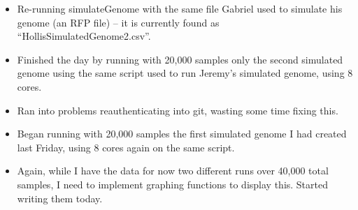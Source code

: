 \documentclass[12pt,hyperref]{labbook}
\newcommand{\sep}{\discretionary{}{}{}} %
\begin{document}
\begin{itemize}
\begin{itemize}
        \item When getCSPEstimates was originally written, Cedric had known it would be (and it is, currently) extendible to FONSE.
        However, it is not currently extendible to RFP.
        \item This led to the TODO note about copying this function and adapting it to RFP, but now it may be simpler to make it generic as Dr. Gilchrist had suggested.
        \item To do so, change it from the suffix Rcpp\sep \_\sep ROC\sep Parameter to simply Rcpp\sep \_\sep Parameter or move this function completely underneath its parent function and avoid another wrapper.
        \item Note that in R code, the current implementation reflects object orientation and inheritance.
        Thus, it's probably better to change it to simply Parameter rather than wiping out the parent wrapping.
        \item Also, the crashing for simulateGenome points to a likely segmentation fault.
        I should try to run Rstudio with simulateGenome on the gauley server, or ask Alan to run it on Windows and Visual Studio when he's back -- both runs will have better error messages to help with debugging.
    \end{itemize}
    \item Re-running simulateGenome with the same file Gabriel used to simulate his genome (an RFP file) -- it is currently found as \enquote{HollisSimulatedGenome2.csv}.
    \item Finished the day by running with 20,000 samples only the second simulated genome using the same script used to run Jeremy's simulated genome, using 8 cores.
\end{itemize}


\begin{itemize}
    \item Ran into problems reauthenticating into git, wasting some time fixing this.
    \item Began running with 20,000 samples the first simulated genome I had created last Friday, using 8 cores again on the same script.
    \item Again, while I have the data for now two different runs over 40,000 total samples, I need to implement graphing functions to display this.
    Started writing them today.
\end{itemize}
\end{document}
